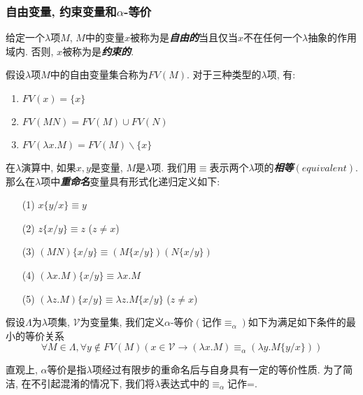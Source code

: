 \subsubsection{自由变量, 约束变量和\texorpdfstring{$\alpha$}{alpha}-等价}
\begin{definition}
    给定一个$\lambda$项$M$, $M$中的变量$x$被称为是\textbf{\textit{自由的}}当且仅当$x$不在任何一个$\lambda$抽象的作用域内. 否则, $x$被称为是\textbf{\textit{约束的}}.
\end{definition}
\noindent 假设$\lambda$项$M$中的自由变量集合称为$FV(M)$. 对于三种类型的$\lambda$项, 有:
\begin{enumerate}
    \item $FV(x)=\{x\}$
    \item $FV(MN)=FV(M)\cup FV(N)$
    \item $FV(\lambda x.M)=FV(M)\backslash\{x\}$
\end{enumerate}
\begin{definition}
    在$\lambda$演算中, 如果$x, y$是变量, $M$是$\lambda$项. 我们用$\equiv$表示两个$\lambda$项的\textbf{\textit{相等}}$\left(\right.equivalent\left.\right)$. 那么在$\lambda$项中\textbf{\textit{重命名}}变量具有形式化递归定义如下:
    \begin{enumerate}\normalfont{}
        \item[(1)] $x\{y/x\}\equiv y$
        \item[(2)] $z\{x/y\}\equiv z$ ($z\not=x$)
        \item[(3)] $(MN)\{x/y\}\equiv(M\{x/y\})(N\{x/y\})$
        \item[(4)] $(\lambda x.M)\{x/y\}\equiv\lambda x.M$
        \item[(5)] $(\lambda z.M)\{x/y\}\equiv\lambda z.M\{x/y\}$ ($z\not=x$)
    \end{enumerate}
\end{definition}
\begin{definition}
    假设$\Lambda$为$\lambda$项集, $\mathcal V$为变量集, 我们定义$\alpha$-等价$\left(\right.$记作$\equiv_\alpha$$\left.\right)$如下为满足如下条件的最小的等价关系
    \[
        \forall M\in \Lambda, \forall y\not\in FV(M)(x\in \mathcal V\to (\lambda x.M)\equiv_\alpha(\lambda y.M\{y/x\}))
    \]
\end{definition}
\noindent 直观上, $\alpha$等价是指$\lambda$项经过有限步的重命名后与自身具有一定的等价性质. 为了简洁, 在不引起混淆的情况下, 我们将$\lambda$表达式中的$\equiv_\alpha$记作=.

